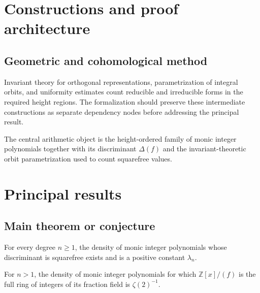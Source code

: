 \chapter{Constructions and proof architecture}
\label{chap:squarefree-values-polynomial-discriminants-method}

\section{Geometric and cohomological method}
\label{sec:squarefree-values-polynomial-discriminants-method}

Invariant theory for orthogonal representations, parametrization of integral orbits, and uniformity estimates count reducible and irreducible forms in the required height regions. The formalization should preserve these intermediate constructions
as separate dependency nodes before addressing the principal result.

\begin{definition}
\label{squarefree-values-polynomial-discriminants-central-object}
The central arithmetic object is the height-ordered family of monic integer polynomials together with its discriminant $\Delta(f)$ and the invariant-theoretic orbit parametrization used to count squarefree values.
\notready
\end{definition}

\chapter{Principal results}
\label{chap:squarefree-values-polynomial-discriminants-results}

\section{Main theorem or conjecture}
\label{sec:squarefree-values-polynomial-discriminants-results}

\begin{theorem}
\label{squarefree-values-polynomial-discriminants-main}
For every degree $n\geq1$, the density of monic integer polynomials whose discriminant is squarefree exists and is a positive constant $\lambda_n$.
\notready
\end{theorem}

\begin{theorem}
\label{squarefree-values-polynomial-discriminants-secondary}
For $n>1$, the density of monic integer polynomials for which $\mathbb Z[x]/(f)$ is the full ring of integers of its fraction field is $\zeta(2)^{-1}$.
\notready
\end{theorem}
